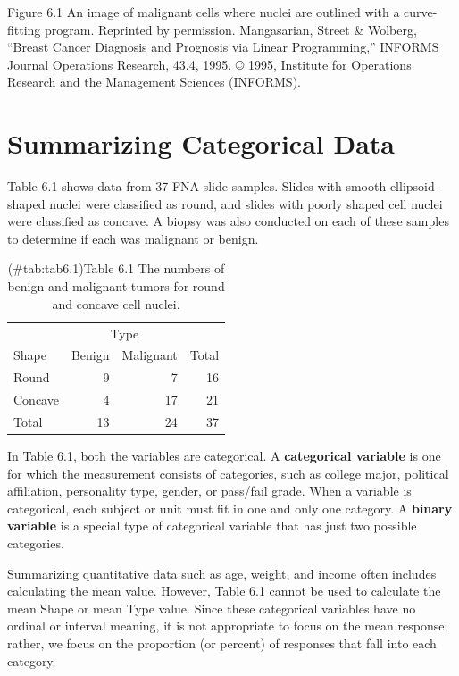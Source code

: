 \documentclass[
]{report}
\begin{document}
Figure 6.1 An image of malignant cells where nuclei are outlined with a curve-fitting program. Reprinted by permission. Mangasarian, Street \& Wolberg, ``Breast Cancer Diagnosis and Prognosis via Linear Programming,'' INFORMS Journal Operations Research, 43.4, 1995. © 1995, Institute for Operations Research and the Management Sciences (INFORMS).

\section{\texorpdfstring{\textbf{Summarizing Categorical Data}}{Summarizing Categorical Data}}\label{summarizing-categorical-data}

Table 6.1 shows data from 37 FNA slide samples. Slides with smooth ellipsoid-shaped nuclei were classified
as round, and slides with poorly shaped cell nuclei were classified as concave. A biopsy was also conducted
on each of these samples to determine if each was malignant or benign.

\begin{table}[H]
\centering
\caption{(\#tab:tab6.1)Table 6.1 The numbers of benign and malignant tumors for round and concave cell nuclei.}
\centering
\begin{tabular}[t]{lrrr}
\toprule
\multicolumn{1}{c}{ } & \multicolumn{2}{c}{Type} & \multicolumn{1}{c}{ } \\
\cmidrule(l{3pt}r{3pt}){2-3}
Shape & Benign & Malignant & Total\\
\midrule
Round & 9 & 7 & 16\\
Concave & 4 & 17 & 21\\
Total & 13 & 24 & 37\\
\bottomrule
\end{tabular}
\end{table}

In Table 6.1, both the variables are categorical. A \textbf{categorical variable} is one for which the measurement
consists of categories, such as college major, political affiliation, personality type, gender, or pass/fail grade.
When a variable is categorical, each subject or unit must fit in one and only one category. A \textbf{binary variable}
is a special type of categorical variable that has just two possible categories.

Summarizing quantitative data such as age, weight, and income often includes calculating the mean value.
However, Table 6.1 cannot be used to calculate the mean Shape or mean Type value. Since these categorical
variables have no ordinal or interval meaning, it is not appropriate to focus on the mean response; rather, we
focus on the proportion (or percent) of responses that fall into each category.
\end{document}
